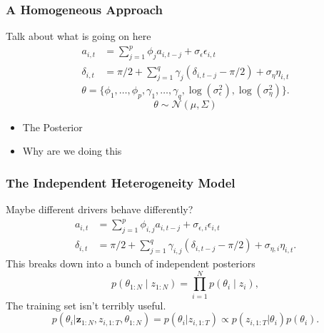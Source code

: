 \documentclass[8pt]{beamer}\usepackage[]{graphicx}\usepackage[]{color}
\begin{document}
\begin{frame}
\frametitle{A Homogeneous Approach}
Talk about what is going on here
\begin{align}
a_{i, t} &= \sum_{j = 1}^p \phi_{j} a_{i, t-j} + \sigma_{\epsilon} \epsilon_{i, t} \label{aAR} \\
\delta_{i, t} &= \pi/2 + \sum_{j = 1}^q \gamma_{j} (\delta_{i, t-j} - \pi/2) + \sigma_{\eta} \eta_{i, t} \label{dAR}
\end{align}
\begin{equation*}
\label{thetaVec}
\theta = \{\phi_{1}, \dots, \phi_{p}, \gamma_{1}, \dots, \gamma_{q}, \log(\sigma^{2}_{\epsilon}), \log(\sigma^{2}_{\eta})\}.
\end{equation*}
\begin{equation}
\label{indPrior}
\theta \sim \mathcal{N}\left(\mu, \Sigma \right)
\end{equation}
\begin{itemize}
\item The Posterior
\item Why are we doing this
\end{itemize}
\end{frame}

\begin{frame}
\frametitle{The Independent Heterogeneity Model}
Maybe different drivers behave differently?
\begin{align}
a_{i, t} &= \sum_{j = 1}^p \phi_{i, j} a_{i, t-j} + \sigma_{\epsilon, i} \epsilon_{i, t} \label{aAR2} \\
\delta_{i, t} &= \pi/2 + \sum_{j = 1}^q \gamma_{i, j} (\delta_{i, t-j} - \pi/2) + \sigma_{\eta, i} \eta_{i, t}. \label{dAR2}
\end{align}
This breaks down into a bunch of independent posteriors
\begin{equation}
p(\theta_{1:N} \mid z_{1:N}) = \prod_{i=1}^N p(\theta_{i} \mid z_{i}),
\end{equation}
The training set isn't terribly useful.
\begin{equation}
p(\theta_{i}| \textbf{z}_{1:N}, z_{i,1:T}, \theta_{1:N}) = p(\theta_{i} | z_{i, 1:T}) \propto p(z_{i, 1:T} | \theta_i) p(\theta_i).
\label{indepNewCar}
\end{equation}
\end{frame}
\end{document}
